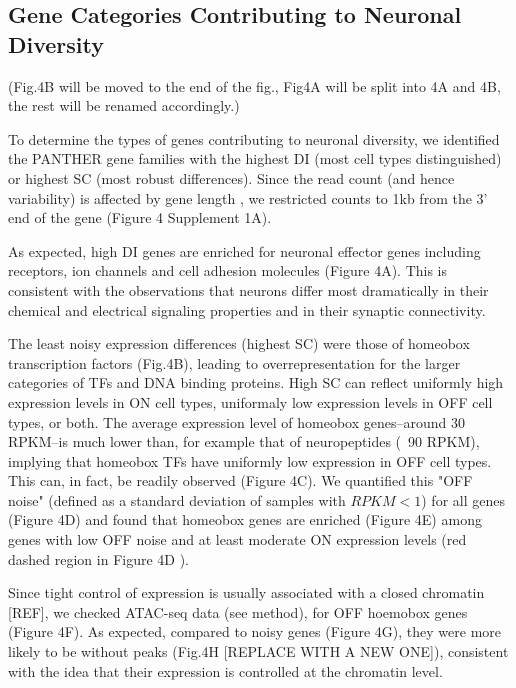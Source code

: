 \subsection{Gene Categories Contributing to Neuronal Diversity}

(Fig.4B will be moved to the end of the fig., Fig4A will be split into 4A and 4B, the rest will be renamed accordingly.)

To determine the types of genes contributing to neuronal diversity, we identified the PANTHER gene families with the highest DI (most cell types distinguished) or highest SC (most robust differences). Since the read count (and hence variability) is affected by gene length \cite{Oshlack_2009}, we restricted counts to 1kb from the 3' end of the gene (Figure 4 Supplement 1A). 

As expected, high DI genes are enriched for neuronal effector genes including receptors, ion channels and cell adhesion molecules (Figure 4A). This is consistent with the observations that neurons differ most dramatically in their chemical and electrical signaling properties and in their synaptic connectivity.

The least noisy expression differences (highest SC) were those of homeobox transcription factors (Fig.4B), leading to overrepresentation for the larger categories of TFs and DNA binding proteins. High SC can reflect uniformly high expression levels in ON cell types, uniformaly low expression levels in OFF cell types, or both. The average expression level of homeobox genes--around 30 RPKM--is much lower than, for example that of  neuropeptides (~90 RPKM), implying that homeobox TFs have uniformly low expression in OFF cell types. This can, in fact, be readily observed (Figure 4C). We quantified this "OFF noise" (defined as a standard deviation of samples with $RPKM<1$) for all genes (Figure 4D) and found that homeobox genes are enriched (Figure 4E) among genes with low OFF noise and at least moderate ON expression levels (red dashed region in Figure 4D ).

Since tight control of expression is usually associated with a closed chromatin [REF], we checked ATAC-seq data (see method), for OFF hoemobox genes (Figure 4F). As expected, compared to noisy genes (Figure 4G), they were more likely to be without peaks (Fig.4H [REPLACE WITH A NEW ONE]), consistent with the idea that their expression is controlled at the chromatin level.


